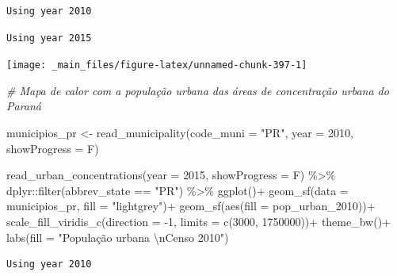 \documentclass[
  brazilian,
]{book}
\newenvironment{Shaded}{\begin{snugshade}}{\end{snugshade}}
\newcommand{\AttributeTok}[1]{\textcolor[rgb]{0.77,0.63,0.00}{#1}}
\newcommand{\CommentTok}[1]{\textcolor[rgb]{0.56,0.35,0.01}{\textit{#1}}}
\newcommand{\DecValTok}[1]{\textcolor[rgb]{0.00,0.00,0.81}{#1}}
\newcommand{\FunctionTok}[1]{\textcolor[rgb]{0.00,0.00,0.00}{#1}}
\newcommand{\NormalTok}[1]{#1}
\newcommand{\OtherTok}[1]{\textcolor[rgb]{0.56,0.35,0.01}{#1}}
\newcommand{\SpecialCharTok}[1]{\textcolor[rgb]{0.00,0.00,0.00}{#1}}
\newcommand{\StringTok}[1]{\textcolor[rgb]{0.31,0.60,0.02}{#1}}
\begin{document}
\begin{verbatim}
Using year 2010
\end{verbatim}

\begin{verbatim}
Using year 2015
\end{verbatim}

\begin{center}\texttt{[image: \_main\_files/figure-latex/unnamed-chunk-397-1]} \end{center}

\begin{Shaded}
\begin{Highlighting}[]
\CommentTok{\# Mapa de calor com a população urbana das áreas de concentração urbana do Paraná}

\NormalTok{municipios\_pr }\OtherTok{\textless{}{-}} \FunctionTok{read\_municipality}\NormalTok{(}\AttributeTok{code\_muni =} \StringTok{"PR"}\NormalTok{,}
                                   \AttributeTok{year =} \DecValTok{2010}\NormalTok{,}
                                   \AttributeTok{showProgress =}\NormalTok{ F)}

\FunctionTok{read\_urban\_concentrations}\NormalTok{(}\AttributeTok{year =} \DecValTok{2015}\NormalTok{,}
                          \AttributeTok{showProgress =}\NormalTok{ F) }\SpecialCharTok{\%\textgreater{}\%} 
\NormalTok{  dplyr}\SpecialCharTok{::}\FunctionTok{filter}\NormalTok{(abbrev\_state }\SpecialCharTok{==} \StringTok{"PR"}\NormalTok{) }\SpecialCharTok{\%\textgreater{}\%}
  \FunctionTok{ggplot}\NormalTok{()}\SpecialCharTok{+}
  \FunctionTok{geom\_sf}\NormalTok{(}\AttributeTok{data =}\NormalTok{ municipios\_pr, }\AttributeTok{fill =} \StringTok{"lightgrey"}\NormalTok{)}\SpecialCharTok{+}
  \FunctionTok{geom\_sf}\NormalTok{(}\FunctionTok{aes}\NormalTok{(}\AttributeTok{fill =}\NormalTok{ pop\_urban\_2010))}\SpecialCharTok{+}
  \FunctionTok{scale\_fill\_viridis\_c}\NormalTok{(}\AttributeTok{direction =} \SpecialCharTok{{-}}\DecValTok{1}\NormalTok{, }\AttributeTok{limits =} \FunctionTok{c}\NormalTok{(}\DecValTok{3000}\NormalTok{, }\DecValTok{1750000}\NormalTok{))}\SpecialCharTok{+}
  \FunctionTok{theme\_bw}\NormalTok{()}\SpecialCharTok{+}
  \FunctionTok{labs}\NormalTok{(}\AttributeTok{fill =} \StringTok{"População urbana }\SpecialCharTok{\textbackslash{}n}\StringTok{Censo 2010"}\NormalTok{)}
\end{Highlighting}
\end{Shaded}

\begin{verbatim}
Using year 2010
\end{verbatim}
\end{document}
